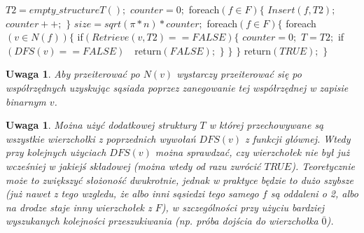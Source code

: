 \documentclass{pracamgr}
\newtheorem{remark}[theorem]{Uwaga}
\begin{document}
    \hspace*{16pt}	$T2=empty\_structureT();$\newline
    \hspace*{16pt}	$counter=0;$\newline
    \hspace*{16pt}	foreach$(f\in F)\{$\newline
    \hspace*{32pt}		$Insert(f,T2);$\newline
    \hspace*{32pt}		$counter++;$\newline
    \hspace*{16pt}	$\}$\newline
    \hspace*{16pt}	$size=sqrt(\pi*n)*counter;$\newline
    \hspace*{16pt}	foreach$(f\in F)\{$\newline
    \hspace*{32pt}		foreach$(v\in N(f))\{$\newline
    \hspace*{48pt}			if$(Retrieve(v,T2)==FALSE)\{$\newline
    \hspace*{64pt}				$counter=0;$\newline
    \hspace*{64pt}				$T=T2;$\newline
    \hspace*{64pt}				if$(DFS(v)==FALSE)\quad $return$(FALSE);$\newline
    \hspace*{48pt}			$\}$\newline
    \hspace*{32pt}		$\}$\newline
    \hspace*{16pt}	$\}$\newline
    \hspace*{16pt}	return$(TRUE);$\newline
    \hspace*{0pt}$\}$\newline
    \begin{remark}\label{przeszukiwanie N(v)}
     Aby przeiterować po $N(v)$ wystarczy przeiterować się po współrzędnych uzyskując sąsiada poprzez zanegowanie tej współrzędnej w zapisie binarnym $v$.
    \end{remark}
    \begin{remark}\label{dwie struktury T}
     Można użyć dodatkowej struktury $T$ w której przechowywane są wszystkie wierzchołki z poprzednich wywołań $DFS(v)$ z funkcji głównej.
     Wtedy przy kolejnych użyciach $DFS(v)$ można sprawdzać, czy wierzchołek nie był już wcześniej w jakiejś składowej (można wtedy od razu zwrócić $TRUE$).
     Teoretycznie może to zwiększyć słożoność dwukrotnie, jednak w praktyce będzie to dużo szybsze
     (już nawet z tego wzgledu, że albo inni sąsiedzi tego samego $f$ są oddaleni o 2, albo na drodze staje inny wierzchołek z $F$),
     w szczególności przy użyciu bardziej wyszukanych kolejności przeszukiwania (np. próba dojścia do wierzchołka $\overline{0}$).
    \end{remark}
     
\end{document}
